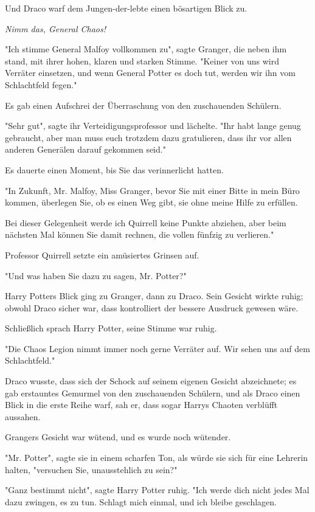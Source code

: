 {Und Draco warf dem Jungen-der-lebte einen bösartigen Blick zu.

\emph{Nimm das, General Chaos!}

"Ich stimme General Malfoy vollkommen zu", sagte Granger, die neben ihm stand, mit ihrer hohen, klaren und starken Stimme. "Keiner von uns wird Verräter einsetzen, und wenn General Potter es doch tut, werden wir ihn vom Schlachtfeld fegen."

Es gab einen Aufschrei der Überraschung von den zuschauenden Schülern.

"Sehr gut", sagte ihr Verteidigungsprofessor und lächelte. "Ihr habt lange genug gebraucht, aber man muss euch trotzdem dazu gratulieren, dass ihr vor allen anderen Generälen darauf gekommen seid."

Es dauerte einen Moment, bis Sie das verinnerlicht hatten.

"In Zukunft, Mr. Malfoy, Miss Granger, bevor Sie mit einer Bitte in mein Büro kommen, überlegen Sie, ob es einen Weg gibt, sie ohne meine Hilfe zu erfüllen.

Bei dieser Gelegenheit werde ich Quirrell keine Punkte abziehen, aber beim nächsten Mal können Sie damit rechnen, die vollen fünfzig zu verlieren."

Professor Quirrell setzte ein amüsiertes Grinsen auf.

"Und was haben Sie dazu zu sagen, Mr. Potter?"

Harry Potters Blick ging zu Granger, dann zu Draco. Sein Gesicht wirkte ruhig; obwohl Draco sicher war, dass kontrolliert der bessere Ausdruck gewesen wäre.

Schließlich sprach Harry Potter, seine Stimme war ruhig.

"Die Chaos Legion nimmt immer noch gerne Verräter auf. Wir sehen uns auf dem Schlachtfeld."

Draco wusste, dass sich der Schock auf seinem eigenen Gesicht abzeichnete; es gab erstauntes Gemurmel von den zuschauenden Schülern, und als Draco einen Blick in die erste Reihe warf, sah er, dass sogar Harrys Chaoten verblüfft aussahen.

Grangers Gesicht war wütend, und es wurde noch wütender.

"Mr. Potter", sagte sie in einem scharfen Ton, als würde sie sich für eine Lehrerin halten, "versuchen Sie, unausstehlich zu sein?"

"Ganz bestimmt nicht", sagte Harry Potter ruhig. "Ich werde dich nicht jedes Mal dazu zwingen, es zu tun. Schlagt mich einmal, und ich bleibe geschlagen.

}
